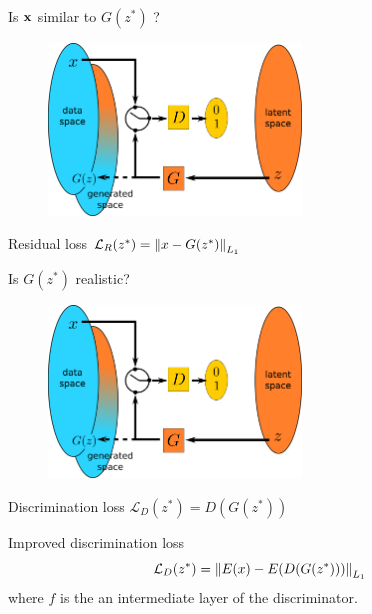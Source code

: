 \documentclass[xcolor=pdftex,dvipsnames,table,mathserif]{beamer}
\begin{document}
\begin{frame}{Is $\mathbf{x}$ similar to $G(z^*)$ ?}

  \begin{figure}[ht]
    \centering
    \includegraphics[width=0.6\textwidth]{gan2}
  \end{figure}

  \begin{block}{Residual loss}
    \centering
    $\mathcal{L}_R(z^*) = \norm{x - G(z^*)}_{L_1}$
  \end{block}

\end{frame}


\begin{frame}{Is $G(z^*)$ realistic?}

  \begin{figure}[ht]
    \centering
    \includegraphics[width=0.6\textwidth]{gan2}
  \end{figure}

  \begin{block}{Discrimination loss}
    \centering
    $\mathcal{L}_D(z^*) = D(G(z^*))$
  \end{block}

  \begin{block}{Improved discrimination loss}
    \[\mathcal{L}_D(z^*) = \norm{E(x) -  E(D(G(z^*)))}_{L_1}\]
    where $f$ is the an intermediate layer of the discriminator.
  \end{block}


\end{frame}
\end{document}
